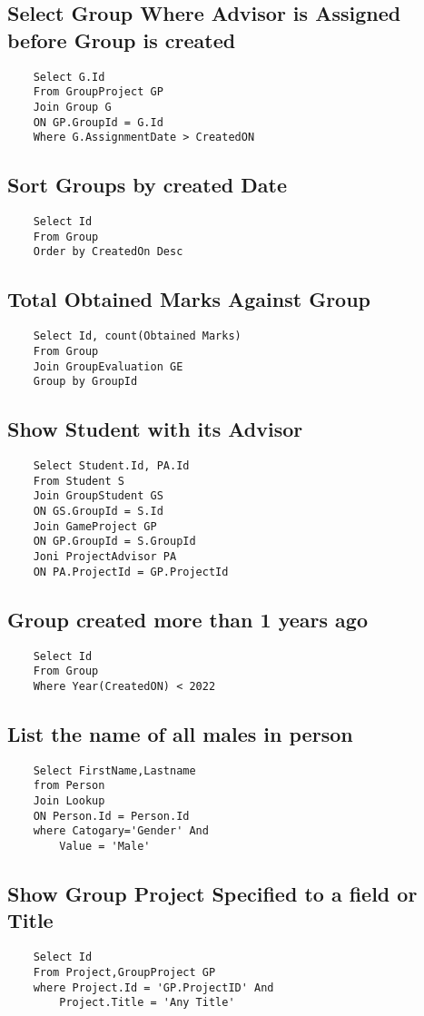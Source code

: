 \documentclass{article}
\begin{document}
\subsection{Select Group Where Advisor is Assigned before Group is created}
\begin{lstlisting}
    Select G.Id
    From GroupProject GP
    Join Group G
    ON GP.GroupId = G.Id
    Where G.AssignmentDate > CreatedON
\end{lstlisting}



\subsection{Sort Groups by created Date}
\begin{lstlisting}
    Select Id
    From Group
    Order by CreatedOn Desc
\end{lstlisting}

\subsection{Total Obtained Marks Against Group}
\begin{lstlisting}
    Select Id, count(Obtained Marks)
    From Group 
    Join GroupEvaluation GE
    Group by GroupId
\end{lstlisting}


\subsection{Show Student with its Advisor}
\begin{lstlisting}
    Select Student.Id, PA.Id
    From Student S
    Join GroupStudent GS
    ON GS.GroupId = S.Id
    Join GameProject GP
    ON GP.GroupId = S.GroupId
    Joni ProjectAdvisor PA
    ON PA.ProjectId = GP.ProjectId
\end{lstlisting}


\subsection{Group created more than 1 years ago}
\begin{lstlisting}
    Select Id
    From Group
    Where Year(CreatedON) < 2022
\end{lstlisting}

\subsection{List the name of all males in person}
\begin{lstlisting}
    Select FirstName,Lastname
    from Person
    Join Lookup
    ON Person.Id = Person.Id
    where Catogary='Gender' And
        Value = 'Male'
\end{lstlisting}

\subsection{Show Group Project Specified to a field or Title}
\begin{lstlisting}
    Select Id 
    From Project,GroupProject GP
    where Project.Id = 'GP.ProjectID' And
        Project.Title = 'Any Title'
\end{lstlisting}
\end{document}
